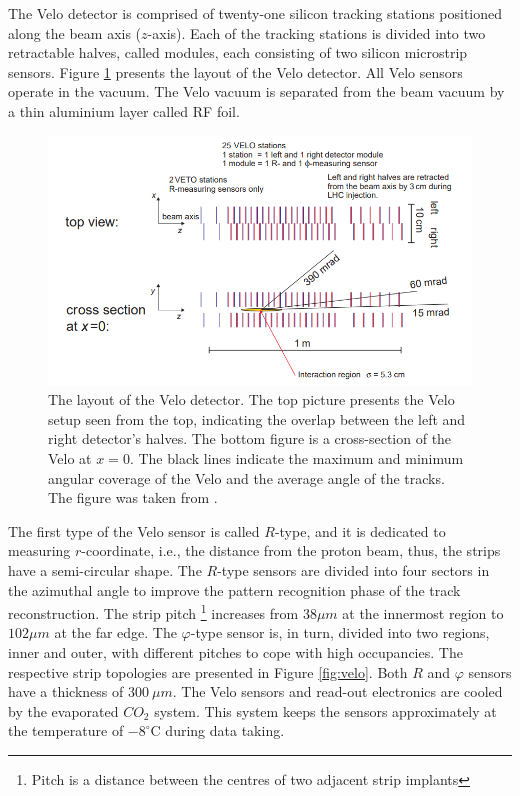 The Velo detector is comprised of twenty-one silicon tracking stations positioned along the beam axis ($z$-axis). Each of the tracking stations is divided into two retractable halves, called modules, each consisting of two silicon microstrip sensors. Figure \ref{fig:veloLayout} presents the layout of the Velo detector. All Velo sensors operate in the vacuum. The Velo vacuum is separated from the beam vacuum by a thin aluminium layer called RF foil.

\begin{figure}[h]
\centering
\includegraphics{figures/VeloLayout.png}
\caption{The layout of the Velo detector. The top picture presents the Velo setup seen from the top, indicating the overlap between the left and right detector's halves. The bottom figure is a cross-section of the Velo at $x=0$. The black lines indicate the maximum and minimum angular coverage of the Velo and the average angle of the tracks. The figure was taken from \cite{VELO}. 
\label{fig:veloLayout}}
\end{figure}

The first type of the Velo sensor is called $R$-type, and it is dedicated to measuring $r$-coordinate, i.e., the distance from the proton beam, thus, the strips have a semi-circular shape. The $R$-type sensors are divided into four sectors in the azimuthal angle to improve the pattern recognition phase of the track reconstruction. The strip pitch \footnote{Pitch is a distance between the centres of two adjacent strip implants} increases from $38\mu m$ at the innermost region to $102 \mu m$ at the far edge. The $\varphi$-type sensor is, in turn, divided into two regions, inner and outer, with different pitches to cope with high occupancies. The respective strip topologies are presented in Figure \ref{fig:velo}. Both $R$ and $\varphi$ sensors have a thickness of $300~\mu m$. The Velo sensors and read-out electronics are cooled by the evaporated $CO_2$ system. This system keeps the sensors approximately at the temperature of $-8^\circ$C during data taking.  


